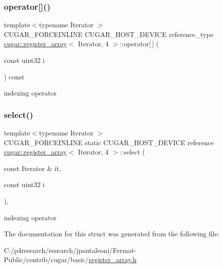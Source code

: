 \subsubsection{\texorpdfstring{operator[]()}{operator[]()}}
{\footnotesize\ttfamily template$<$typename Iterator $>$ \\
C\+U\+G\+A\+R\+\_\+\+F\+O\+R\+C\+E\+I\+N\+L\+I\+NE C\+U\+G\+A\+R\+\_\+\+H\+O\+S\+T\+\_\+\+D\+E\+V\+I\+CE reference\+\_\+type \hyperlink{structcugar_1_1register__array}{cugar\+::register\+\_\+array}$<$ Iterator, 4 $>$\+::operator\mbox{[}$\,$\mbox{]} (\begin{DoxyParamCaption}\item[{const uint32}]{i }\end{DoxyParamCaption}) const\hspace{0.3cm}{\ttfamily [inline]}}

indexing operator \mbox{\label{structcugar_1_1register__array_3_01_iterator_00_014_01_4_a3f15c0411724344e0d8cbee96eeb89cf}} 
\subsubsection{\texorpdfstring{select()}{select()}}
{\footnotesize\ttfamily template$<$typename Iterator $>$ \\
C\+U\+G\+A\+R\+\_\+\+F\+O\+R\+C\+E\+I\+N\+L\+I\+NE static C\+U\+G\+A\+R\+\_\+\+H\+O\+S\+T\+\_\+\+D\+E\+V\+I\+CE reference \hyperlink{structcugar_1_1register__array}{cugar\+::register\+\_\+array}$<$ Iterator, 4 $>$\+::select (\begin{DoxyParamCaption}\item[{const Iterator \&}]{it,  }\item[{const uint32}]{i }\end{DoxyParamCaption})\hspace{0.3cm}{\ttfamily [inline]}, {\ttfamily [static]}}

indexing operator 

The documentation for this struct was generated from the following file\+:\begin{DoxyCompactItemize}
\item 
C\+:/p4research/research/jpantaleoni/\+Fermat-\/\+Public/contrib/cugar/basic/\hyperlink{register__array_8h}{register\+\_\+array.\+h}\end{DoxyCompactItemize}
